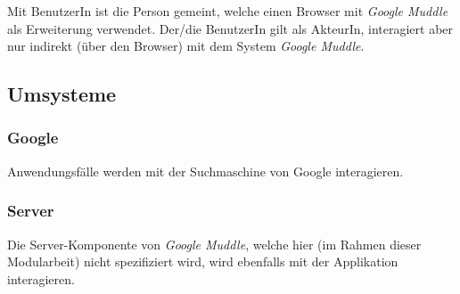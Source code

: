 Mit BenutzerIn ist die Person gemeint, welche einen Browser mit \textit{Google
Muddle} als Erweiterung verwendet. Der/die BenutzerIn gilt als AkteurIn,
interagiert aber nur indirekt (über den Browser) mit dem System \textit{Google
Muddle}.

\subsection{Umsysteme}

\subsubsection*{Google}

Anwendungsfälle werden mit der Suchmaschine von Google interagieren.

\subsubsection*{Server}

Die Server-Komponente von \textit{Google Muddle}, welche hier (im Rahmen dieser
Modularbeit) nicht spezifiziert wird, wird ebenfalls mit der Applikation
interagieren.
